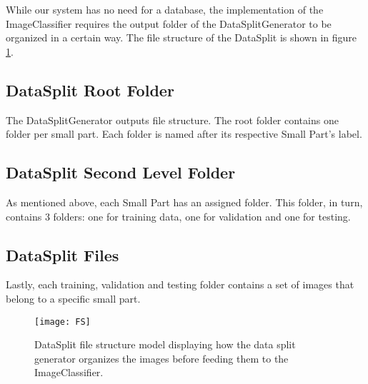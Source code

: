 While our system has no need for a database, the implementation of the ImageClassifier requires the output folder of the DataSplitGenerator to be organized in a certain way. The file structure of the DataSplit is shown in figure \ref{fig:FS}.

\subsection{DataSplit Root Folder}
The DataSplitGenerator outputs file structure. The root folder contains one folder per small part. Each folder is named after its respective Small Part's label.

\subsection{DataSplit Second Level Folder}
As mentioned above, each Small Part has an assigned folder. This folder, in turn, contains 3 folders: one for training data, one for validation and one for testing.

\subsection{DataSplit Files}
Lastly, each training, validation and testing folder contains a set of images that belong to a specific small part.


\begin{figure}[h]
\centering
  \texttt{[image: FS]}
\caption{DataSplit file structure model displaying how the data split generator organizes the images before feeding them to the ImageClassifier.}
\label{fig:FS}
\end{figure}
